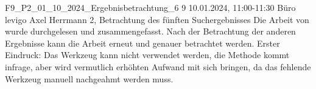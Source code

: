 \fieldnote
{F9\_P2\_01\_10\_2024\_Ergebnisbetrachtung\_6}
{9}
{10.01.2024, 11:00-11:30}
{Büro levigo}
{Axel Herrmann}
{2, Betrachtung des fünften Suchergebnisses}
{
  Die Arbeit von  wurde durchgelesen und zusammengefasst.
}
{
  Nach der Betrachtung der anderen Ergebnisse kann die Arbeit erneut und genauer betrachtet werden.
}
{
}
{}
{
  Erster Eindruck: Das Werkzeug kann nicht verwendet werden, die Methode kommt infrage, aber wird vermutlich erhöhten Aufwand mit sich bringen, da das fehlende Werkzeug manuell nachgeahmt werden muss.
}
